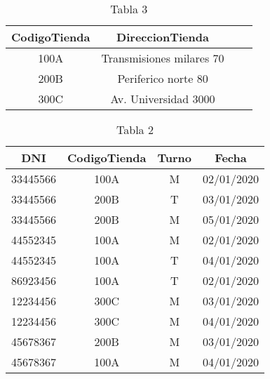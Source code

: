 \documentclass[letterpaper,12pt]{article}
\begin{document}
    \begin{table}[h!]
        \begin{center}
        \begin{tabular}{|c|c|c|c|}
        \hline
        \textbf{CodigoTienda}&\textbf{DireccionTienda}\\
        \hline
       
         100A & Transmisiones milares 70\\\hline
         200B & Periferico norte 80\\\hline
         300C & Av. Universidad 3000\\\hline
         
                
        \end{tabular}
        \end{center}
        \caption{Tabla 3}
    \end{table}
   \begin{table}[h!]
        \begin{center}
        \begin{tabular}{|c|c|c|c|}
        \hline
        \textbf{DNI}&\textbf{CodigoTienda}&\textbf{Turno}&\textbf{Fecha}\\
        \hline
       
33445566 & 100A & M & 02/01/2020 \\\hline
33445566 & 200B &  T & 03/01/2020\\\hline
33445566 & 200B &   M & 05/01/2020\\\hline
44552345 & 100A &  M & 02/01/2020\\\hline
44552345 & 100A &  T & 04/01/2020\\\hline
86923456 & 100A &  T & 02/01/2020\\\hline
12234456 & 300C &  M & 03/01/2020\\\hline
12234456 & 300C &  M & 04/01/2020\\\hline
45678367 & 200B &  M & 03/01/2020\\\hline
45678367 & 100A & M & 04/01/2020\\\hline
        
        \end{tabular}
        \end{center}
        \caption{Tabla 2}
    \end{table}
\end{document}
